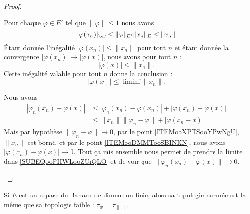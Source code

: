 \begin{proof}
\begin{subproof}
        Pour chaque \( \varphi\in E'\) tel que \( \| \varphi \|\leq 1\) nous avons
        \begin{equation}
            | \varphi(x_n) |_{\eF}\leq \| \varphi \|_{E'}\| x_n \|_E\leq \| x_n \|
        \end{equation}
        Étant donnée l'inégalité \( | \varphi(x_n) |\leq \| x_n \|\) pour tout \( n\) et étant donnée la convergence \( | \varphi(x_n) |\to | \varphi(x) |\), nous avons pour tout \( n\) :
        \begin{equation}
            | \varphi(x) |\leq \| x_n \|.
        \end{equation}
        Cette inégalité valable pour tout \( n \) donne la conclusion :
        \begin{equation}
            | \varphi(x) |\leq  \liminf\| x_n \|.
        \end{equation}
        

    
    Nous avons 
    \begin{subequations}        \label{SUBEQooPHWLooZUiQLO}
        \begin{align}
            | \varphi_n(x_n)-\varphi(x) |&\leq | \varphi_n(x_n)-\varphi(x_n) |+| \varphi(x_n)-\varphi(x) |\\
            &\leq \| x_n \|\| \varphi_n-\varphi \|+| \varphi(x_n-x) |
        \end{align}
    \end{subequations}
    Mais par hypothèse \( \| \varphi_n-\varphi \|\to 0\), par le point \ref{ITEMooXPTSooYPwNgU}, \( \| x_n \|\) est borné, et par le point \ref{ITEMooDMMTooSBINKN}, nous avons \( | \varphi(x_n)-\varphi(x) |\to 0\). Tout ça mis ensemble nous permet de prendre la limite dans \eqref{SUBEQooPHWLooZUiQLO} et de voir que \( \| \varphi_n(x_n)-\varphi(x) \|\to 0\).

    \end{subproof}
\end{proof}


\begin{proposition}
    Si \( E\) est un espace de Banach de dimension finie, alors sa topologie normée est la même que sa topologie faible : \( \tau_w=\tau_{\| . \|}\).
\end{proposition}

